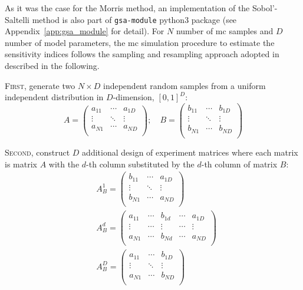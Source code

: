 As it was the case for the Morris method, an implementation of the Sobol'-Saltelli method is also part of \texttt{gsa-module} python3 package (see Appendix~\ref{app:gsa_module} for detail). 
For $N$ number of \gls{mc} samples and $D$ number of model parameters, the \gls{mc} simulation procedure to estimate the sensitivity indices follows the sampling and resampling approach adopted in~\cite{Sobol2001,Saltelli2002,Homma1996} described in the following.

\textsc{First}, generate two $N \times D$ independent random samples from a uniform independent distribution in $D$-dimension, $[0,1]^D$:
\begin{equation}
A = 
\begin{pmatrix}
a_{11}  & \cdots  & a_{1D}\\
\vdots	& \ddots & \vdots\\
a_{N1}  & \cdots  & a_{ND}\\
\end{pmatrix}
;\quad B = 
\begin{pmatrix}
b_{11}  & \cdots  & b_{1D}\\
\vdots	& \ddots & \vdots\\
b_{N1}  & \cdots  & b_{ND}\\
\end{pmatrix}
\label{eq:ss_two_samples}
\end{equation}

\textsc{Second}, construct $D$ additional design of experiment matrices where each matrix is matrix $A$ with the $d$-th column substituted by the $d$-th column of matrix $B$:\begin{equation}
  \begin{split}
  & A_{B}^1 = 
  \begin{pmatrix}
    b_{11}  & \cdots  & a_{1D}\\
    \vdots	& \ddots & \vdots\\
    b_{N1}  & \cdots  & a_{ND}\\
  \end{pmatrix} \\
  & A_{B}^{d} = 
  \begin{pmatrix}
    a_{11}  & \cdots & b_{1d} & \cdots & a_{1D}\\
    \vdots	& \cdots & \vdots & \cdots & \vdots\\
    a_{N1}  & \cdots & b_{Nd} & \cdots & a_{ND}\\
  \end{pmatrix} \\
  & A_{B}^{D} = 
  \begin{pmatrix}
    a_{11}  & \cdots  & b_{1D}\\
    \vdots	& \ddots & \vdots\\
    a_{N1}  & \cdots  & b_{ND}\\
  \end{pmatrix}
  \end{split}
\label{eq:ss_sampling_resampling}
\end{equation}

